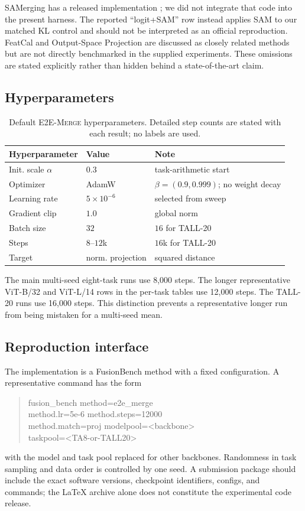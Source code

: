 \documentclass[letterpaper]{article} %
\newcommand{\method}{\textup{\textsc{E2E-Merge}}\xspace}
\theoremstyle{plain}
\theoremstyle{definition}
\begin{document}
SAMerging has a released implementation \citep{samerging2025}; we did not integrate that
code into the present harness. The reported ``logit+SAM'' row instead applies SAM to our
matched KL control and should not be interpreted as an official reproduction. FeatCal and
Output-Space Projection are discussed as closely related methods
\citep{featcal2026,outputprojection2026} but are not directly benchmarked in the supplied
experiments. These omissions are stated explicitly rather than hidden behind a
state-of-the-art claim.

\subsection{Hyperparameters}
\begin{table}[tb]
\centering
{\small
\begin{tabular}{p{0.92in}p{0.72in}p{1.18in}}
\toprule
Hyperparameter & Value & Note \\
\midrule
Init. scale $\alpha$ & $0.3$ & task-arithmetic start \\
Optimizer & AdamW & $\beta=(0.9,0.999)$; no weight decay \\
Learning rate & $5\times10^{-6}$ & selected from sweep \\
Gradient clip & $1.0$ & global norm \\
Batch size & $32$ & $16$ for TALL-20 \\
Steps & $8$--$12$k & $16$k for TALL-20 \\
Target & norm. projection & squared distance \\
\bottomrule
\end{tabular}
}
\caption{Default \method hyperparameters. Detailed step counts are stated with each
result; no labels are used.}
\label{tab:hyperparameters}
\end{table}

The main multi-seed eight-task runs use 8,000 steps. The longer representative
ViT-B/32 and ViT-L/14 rows in the per-task tables use 12,000 steps. The TALL-20 runs use
16,000 steps. This distinction prevents a representative longer run from being mistaken
for a multi-seed mean.

\subsection{Reproduction interface}
The implementation is a FusionBench method with a fixed configuration. A representative
command has the form
\begin{quote}\footnotesize\ttfamily\raggedright
fusion\_bench method=e2e\_merge\\
method.lr=5e-6 method.steps=12000\\
method.match=proj modelpool=<backbone>\\
taskpool=<TA8-or-TALL20>
\end{quote}
with the model and task pool replaced for other backbones. Randomness in task sampling
and data order is controlled by one seed. A submission package should include the exact
software versions, checkpoint identifiers, configs, and commands; the LaTeX archive alone
does not constitute the experimental code release.
\end{document}

